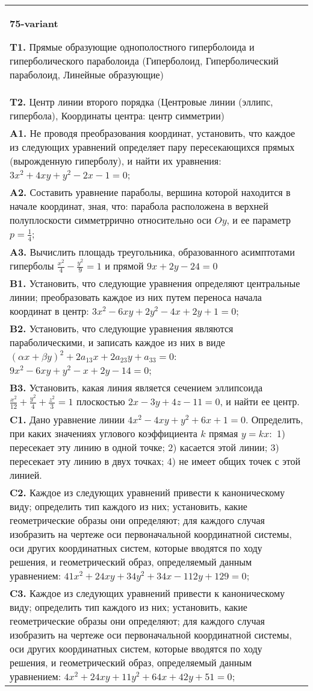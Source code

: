 \documentclass{article}
\begin{document}
\begin{tabular}{m{17cm}}
\textbf{75-variant}
\newline

\textbf{T1.} Прямые образующие однополостного гиперболоида и гиперболического параболоида (Гиперболоид, Гиперболический параболоид, Линейные образующие) \\
\textbf{T2.} Центр линии второго порядка (Центровые линии (эллипс, гипербола), Координаты центра: центр симметрии) \\
\textbf{A1.} Не проводя преобразования координат, установить, что каждое из следующих уравнений определяет пару пересекающихся прямых (вырожденную гиперболу), и найти их уравнения: $3 x^2+4 x y+y^2-2 x-1=0$; \\
\textbf{A2.} Составить уравнение параболы, вершина которой находится в начале координат, зная, что: парабола расположена в верхней полуплоскости симметррично относительно оси $O y$, и ее параметр $p=\frac{1}{4}$; \\
\textbf{A3.} Вычислить площадь треугольника, образованного асимптотами гиперболы $\frac{x^2}{4}-\frac{y^2}{9}=1$ и прямой $9 x+2 y-24=0$ \\
\textbf{B1.} Установить, что следующие уравнения определяют центральные линии; преобразовать каждое из них путем переноса начала координат в центр: $3 x^2-6 x y+2 y^2-4 x+2 y+1=0$; \\
\textbf{B2.} Установить, что следующие уравнения являются параболическими, и записать каждое из них в виде $(\alpha x+\beta y)^2+2 a_{13} x+2 a_{23} y+a_{33}=0$: $9 x^2-6 x y+y^2-x+2 y-14=0$; \\
\textbf{B3.} Установить, какая линия является сечением эллипсоида $\frac{x^2}{12}+\frac{y^2}{4}+\frac{z^2}{3}=1$ плоскостью $2 x-3 y+4 z-11=0$, и найти ее центр. \\
\textbf{C1.} Дано уравнение линии $4 x^2-4 x y+y^2+6 x+1=0$. Определить, при каких значениях углового коэффициента $k$ прямая $y=k x:$ 1) пересекает эту линию в одной точке; 2) касается этой линии; 3) пересекает эту линию в двух точках; 4) не имеет общих точек с этой линией. \\
\textbf{C2.} Каждое из следующих уравнений привести к каноническому виду; определить тип каждого из них; установить, какие геометрические образы они определяют; для каждого случая изобразить на чертеже оси первоначальной координатной системы, оси других координатных систем, которые вводятся по ходу решения, и геометрический образ, определяемый данным уравнением: $41 x^2+24 x y+34 y^2+34 x-112 y+129=0$; \\
\textbf{C3.} Каждое из следующих уравнений привести к каноническому виду; определить тип каждого из них; установить, какие геометрические образы они определяют; для каждого случая изобразить на чертеже оси первоначальной координатной системы, оси других координатных систем, которые вводятся по ходу решения, и геометрический образ, определяемый данным уравнением: $4 x^2+24 x y+11 y^2+64 x+42 y+51=0$; \\

\end{tabular}
\vspace{1cm}
\end{document}
